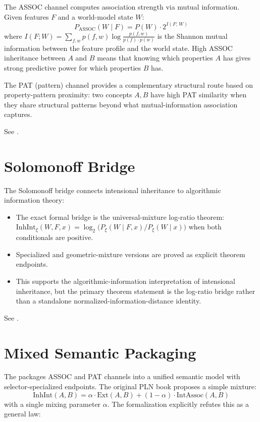 \documentclass[11pt,openany]{report}
\begin{document}
The ASSOC channel computes association strength via mutual information.
Given features $F$ and a world-model state $W$:
\[
  P_{\mathrm{ASSOC}}(W \mid F) = P(W) \cdot 2^{I(F;\,W)}
\]
where $I(F; W) = \sum_{f,w} p(f,w) \log \frac{p(f,w)}{p(f) \cdot p(w)}$
is the Shannon mutual information between the feature profile and the
world state.  High ASSOC inheritance between $A$ and $B$ means that
knowing which properties $A$ has gives strong predictive power for which
properties $B$ has.

The PAT (pattern) channel provides a complementary structural route based
on property-pattern proximity: two concepts $A, B$ have high PAT similarity
when they share structural patterns beyond what mutual-information association
captures.

See .

\section{Solomonoff Bridge}

The Solomonoff bridge connects intensional inheritance to algorithmic
information theory:
\begin{itemize}
\item The exact formal bridge is the universal-mixture log-ratio theorem:
  $\mathrm{InhInt}_{\xi}(W,F,x)
  = \log_2\!\bigl(P_{\xi}(W \mid F,x) / P_{\xi}(W \mid x)\bigr)$
  when both conditionals are positive.
\item Specialized  and geometric-mixture versions are
  proved as explicit theorem endpoints.
\item This supports the algorithmic-information interpretation of
  intensional inheritance, but the primary theorem statement is the
  log-ratio bridge rather than a standalone normalized-information-distance
  identity.
\end{itemize}

See .

\section{Mixed Semantic Packaging}

The  packages ASSOC and PAT channels into a
unified semantic model with selector-specialized endpoints.  The original
PLN book proposes a simple mixture:
\[
  \mathrm{InhInt}(A, B) = \alpha \cdot \mathrm{Ext}(A, B)
  + (1 - \alpha) \cdot \mathrm{IntAssoc}(A, B)
\]
with a single mixing parameter $\alpha$.  The formalization explicitly
refutes this as a general law:
\end{document}

